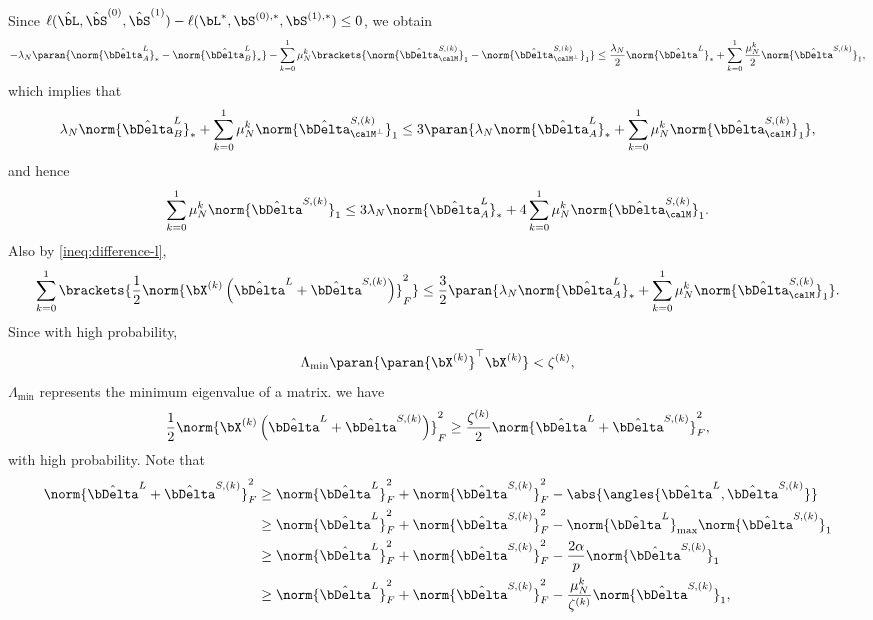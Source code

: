        	Since $\ell(\hat\bL, \hat\bS^{(0)}, \hat\bS^{(1)}) - \ell(\bL^*, \bS^{(0), *}, \bS^{(1), *})\leq 0$, we obtain 
       	$$-\lambda_N\paran{\norm{\hat\bDelta^{L}_A}_* - \norm{\hat\bDelta^{L}_B}_*} - \sum_{k=0}^1 \mu^k_{N}\brackets{\norm{\hat\bDelta^{S, (k)}_{\calM}}_1 - \norm{\hat\bDelta^{S, (k)}_{\calM^{\perp}}}_1} \leq \frac{\lambda_N}{2}\norm{\hat\bDelta^L}_* + \sum_{k=0}^1 \frac{\mu^k_N}{2}\norm{\hat\bDelta^{S, (k)}}_1,$$
       	which implies that
       	\begin{equation}
       		\lambda_N\norm{\hat\bDelta^{L}_B}_* + \sum_{k=0}^1\mu^k_N\norm{\hat\bDelta^{S, (k)}_{\calM^{\perp}}}_1 \leq 3\paran{\lambda_N\norm{\hat\bDelta^{L}_A}_* + \sum_{k=0}^1\mu^k_N\norm{\hat\bDelta^{S, (k)}_{\calM}}_1},
       		\label{ineq:BMcleq3AM}
       	\end{equation}
       and hence
      \begin{equation}
       	 \sum_{k=0}^1\mu^k_N\norm{\hat\bDelta^{S, (k)}}_1 \leq 3\lambda_N\norm{\hat\bDelta^{L}_A}_* + 4 \sum_{k=0}^1\mu^k_N\norm{\hat\bDelta^{S, (k)}_{\calM}}_1.
       	\label{ineq:DeltaSleq3A+4M}
       \end{equation}
       Also by \eqref{ineq:difference-l}, 
       \begin{equation}
       	\sum_{k=0}^1\brackets{\frac{1}{2}\norm{\bX^{(k)}\left(\hat\bDelta^L+\hat\bDelta^{S, (k)}\right)}_F^2} \leq \frac{3}{2}\paran{\lambda_N\norm{\hat\bDelta^{L}_A}_* + \sum_{k=0}^1\mu^k_N\norm{\hat\bDelta^{S, (k)}_{\calM}}_1}.
       	\label{ineq:upperbound-Fnorm-XDelta}
       \end{equation}
	  Since with high probability,
	   $$\Lambda_{\min}\paran{\paran{\bX^{(k)}}^{\top}\bX^{(k)}} < \zeta^{(k)},$$
	   $\Lambda_{\min}$ represents the minimum eigenvalue of a matrix. we have
       \begin{equation}
	   \frac{1}{2}\norm{\bX^{(k)}\left(\hat\bDelta^L+\hat\bDelta^{S, (k)}\right)}_F^2 \geq \frac{\zeta^{(k)}}{2} \norm{\hat\bDelta^L+\hat\bDelta^{S, (k)}}^2_F,
       \label{ineq:covex-condition}
       \end{equation}
	    with high probability. Note that 
	    \begin{equation}
	    	    \begin{aligned}
	    		\norm{\hat\bDelta^L+\hat\bDelta^{S, (k)}}^2_F&\geq \norm{\hat\bDelta^L}_F^2 + \norm{\hat\bDelta^{S, (k)}}_F^2 - \abs{\angles{\hat\bDelta^L, \hat\bDelta^{S, (k)}}}\\
	    		&\geq \norm{\hat\bDelta^L}_F^2 + \norm{\hat\bDelta^{S, (k)}}_F^2  
	    		-\norm{\hat\bDelta^L}_{\max} \norm{\hat\bDelta^{S, (k)}}_1\\
	    		&\geq \norm{\hat\bDelta^L}_F^2 + \norm{\hat\bDelta^{S, (k)}}_F^2-\frac{2\alpha}{p}\norm{\hat\bDelta^{S, (k)}}_1\\
	    		&\geq \norm{\hat\bDelta^L}_F^2 + \norm{\hat\bDelta^{S, (k)}}_F^2-\frac{\mu_N^k}{\zeta^{(k)}}\norm{\hat\bDelta^{S, (k)}}_1,
	    	\end{aligned}
    	\label{ineq:lowerbound-Fnorm-XDelta}
	    \end{equation}
